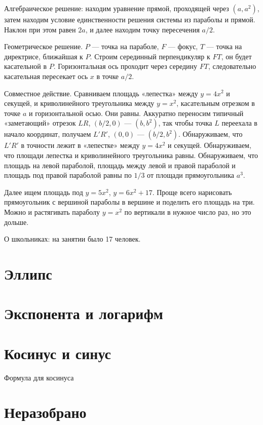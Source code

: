 \documentclass[12pt]{article}
\theoremstyle{definition}
\begin{document}
Алгебраическое решение: находим уравнение прямой, проходящей через $(a, a^2)$, затем 
находим условие единственности решения системы из параболы и прямой. Наклон при этом равен $2a$, 
и далее находим точку пересечения $a/2$.

Геометрическое решение. $P$ — точка на параболе, $F$ — фокус, $T$ — точка на директрисе,
ближайшая к $P$. Строим серединный перпендикуляр к $FT$, он будет касательной в $P$. 
Горизонтальная ось проходит через середину $FT$, следовательно касательная пересекает ось $x$ 
в точке $a/2$. 


Совместное действие. Сравниваем площадь «лепестка» между $y=4x^2$ и секущей, и криволинейного треугольника
между $y=x^2$, касательным отрезком в точке $a$ и горизонтальной осью. Они равны. 
Аккуратно переносим типичный «заметающий» отрезок $LR$, $(b/2, 0)$ — $(b, b^2)$, так чтобы 
точка $L$ переехала в начало координат, получаем $L'R'$, $(0, 0)$ — $(b/2, b^2)$. 
Обнаруживаем, что $L'R'$ в точности лежит в «лепестке» между $y=4x^2$ и секущей.
Обнаруживаем, что площади лепестка и криволинейного треугольника равны. Обнаруживаем, что площадь
на левой параболой, площадь между левой и правой параболой и площадь под правой параболой равны по $1/3$ от площади прямоугольника $a^3$.

Далее ищем площадь под $y=5x^2$, $y=6x^2 + 17$.
Проще всего нарисовать прямоугольник с вершиной параболы в вершине и поделить его площадь на три. 
Можно и растягивать параболу $y=x^2$ по вертикали в нужное число раз, но это дольше. 

О школьниках: на занятии было 17 человек.

\section{Эллипс}

\section{Экспонента и логарифм}

\section{Косинус и синус}

Формула для косинуса

\section{Неразобрано}
\end{document}
